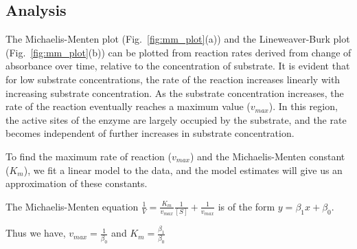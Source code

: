 \documentclass[a4paper,10pt]{article}
\begin{document}
            \subsection*{Analysis}
                The Michaelis-Menten plot (Fig.~\ref{fig:mm_plot}(a)) and the Lineweaver-Burk plot 
                (Fig.~\ref{fig:mm_plot}(b)) can be plotted from reaction rates derived 
                from change of absorbance over time, relative to the concentration of substrate. 
                It is evident that for low substrate concentrations, the rate of the reaction increases 
                linearly with increasing substrate concentration. As the substrate concentration increases, 
                the rate of the reaction eventually reaches a maximum value ($v_{max}$). 
                In this region, the active sites of the enzyme are largely occupied by the substrate, 
                and the rate becomes independent of further increases in substrate concentration.

                To find the maximum rate of reaction ($v_{max}$) and the Michaelis-Menten constant ($K_m$),
                we fit a linear model to the data, and the model estimates will give us an approximation of these constants.

                The Michaelis-Menten equation
                $ \frac{1}{V} = \frac{K_m}{v_{max}}\frac{1}{[S]} + \frac{1}{v_{max}} $
                is of the form
                $ y = \beta_1x + \beta_0 $.

                \begin{center}
                    Thus we have,
                    $ v_{max} = \frac{1}{\beta_0} $ and $ K_m = \frac{\beta_1}{\beta_0}  $
                \end{center}
\end{document}

